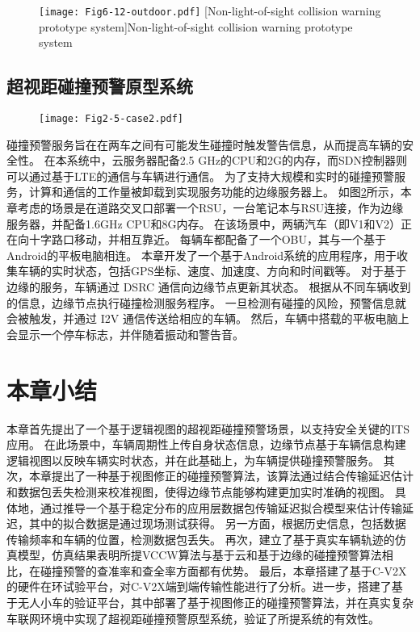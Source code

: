 \begin{figure}[h]
\centering
  \texttt{[image: Fig6-12-outdoor.pdf]}
  [Non-light-of-sight collision warning prototype system]{Non-light-of-sight collision warning prototype system}
  \label{fig 5-12}
\end{figure}

\subsection{超视距碰撞预警原型系统}

\begin{figure}[h] 
	\centering
	\texttt{[image: Fig2-5-case2.pdf]}
	\label{fig 2-5}
\end{figure}

碰撞预警服务旨在在两车之间有可能发生碰撞时触发警告信息，从而提高车辆的安全性。
在本系统中，云服务器配备2.5 GHz的CPU和2G的内存，而SDN控制器则可以通过基于LTE的通信与车辆进行通信。
为了支持大规模和实时的碰撞预警服务，计算和通信的工作量被卸载到实现服务功能的边缘服务器上。
如图\ref{fig 2-5}所示，本章考虑的场景是在道路交叉口部署一个RSU，一台笔记本与RSU连接，作为边缘服务器，并配备1.6GHz CPU和8G内存。
在该场景中，两辆汽车（即V1和V2）正在向十字路口移动，并相互靠近。
每辆车都配备了一个OBU，其与一个基于Android的平板电脑相连。
本章开发了一个基于Android系统的应用程序，用于收集车辆的实时状态，包括GPS坐标、速度、加速度、方向和时间戳等。
对于基于边缘的服务，车辆通过 DSRC 通信向边缘节点更新其状态。
根据从不同车辆收到的信息，边缘节点执行碰撞检测服务程序。
一旦检测有碰撞的风险，预警信息就会被触发，并通过 I2V 通信传送给相应的车辆。
然后，车辆中搭载的平板电脑上会显示一个停车标志，并伴随着振动和警告音。


\section{本章小结}\label{section 5-6}

本章首先提出了一个基于逻辑视图的超视距碰撞预警场景，以支持安全关键的ITS应用。
在此场景中，车辆周期性上传自身状态信息，边缘节点基于车辆信息构建逻辑视图以反映车辆实时状态，并在此基础上，为车辆提供碰撞预警服务。
其次，本章提出了一种基于视图修正的碰撞预警算法，该算法通过结合传输延迟估计和数据包丢失检测来校准视图，使得边缘节点能够构建更加实时准确的视图。
具体地，通过推导一个基于稳定分布的应用层数据包传输延迟拟合模型来估计传输延迟，其中的拟合数据是通过现场测试获得。
另一方面，根据历史信息，包括数据传输频率和车辆的位置，检测数据包丢失。
再次，建立了基于真实车辆轨迹的仿真模型，仿真结果表明所提VCCW算法与基于云和基于边缘的碰撞预警算法相比，在碰撞预警的查准率和查全率方面都有优势。
最后，本章搭建了基于C-V2X的硬件在环试验平台，对C-V2X端到端传输性能进行了分析。进一步，搭建了基于无人小车的验证平台，其中部署了基于视图修正的碰撞预警算法，并在真实复杂车联网环境中实现了超视距碰撞预警原型系统，验证了所提系统的有效性。